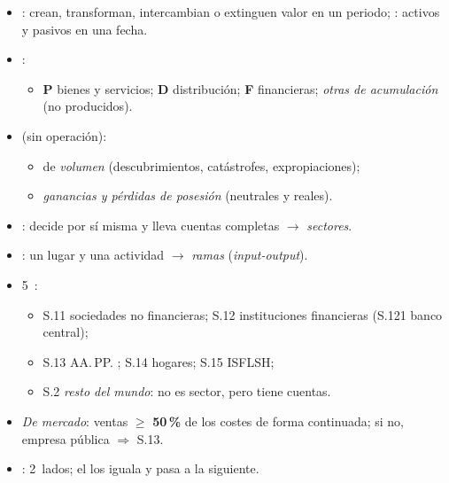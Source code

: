 \documentclass{article}
\begin{document}
\begin{columnas}
\begin{itemize}
\item {}: crean, transforman, intercambian o extinguen valor en un periodo; : activos y pasivos en una fecha.
\item {}:
  \begin{itemize}
  \item \textbf{P} bienes y servicios; \textbf{D} distribución; \textbf{F} financieras; \emph{otras de acumulación} (no producidos).
  \end{itemize}
\item {} (sin operación):
  \begin{itemize}
  \item de \emph{volumen} (descubrimientos, catástrofes, expropiaciones);
  \item \emph{ganancias y pérdidas de posesión} (neutrales y reales).
  \end{itemize}
\end{itemize}
\begin{itemize}
\item {}: decide por sí misma y lleva cuentas completas $\to$ \emph{sectores}.
\item {}: un lugar y una actividad $\to$ \emph{ramas} (\emph{input-output}).
\item 5~:
  \begin{itemize}
  \item S.11 sociedades no financieras; S.12 instituciones financieras (S.121 banco central);
  \item S.13 AA.\,PP. ; S.14 hogares; S.15 ISFLSH;
  \item S.2 \emph{resto del mundo}: no es sector, pero tiene cuentas.
  \end{itemize}
\item \emph{De mercado}: ventas $\geq$ \textbf{50\,\%} de los costes de forma continuada; si no, empresa pública $\Rightarrow$ S.13.
\end{itemize}
\begin{itemize}
\item {}: 2~lados; el  los iguala y pasa a la siguiente.

\end{itemize}
\end{columnas}
\end{document}
